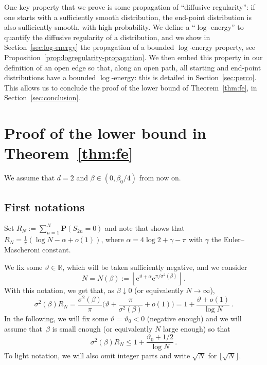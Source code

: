 \documentclass[11pt]{amsart}
\numberwithin{equation}{section}
\newcommand*{\bP}{\mathbf{P}}
\newcommand*{\numberset}{\mathbb}
\newcommand*{\R}{\numberset{R}}
\newcommand{\e}{\mathrm{e}}
\theoremstyle{plain}
\theoremstyle{definition}
\theoremstyle{remark}
\begin{document}
One key property that we prove is some propagation of ``diffusive regularity'': if one starts with a sufficiently smooth distribution, the end-point distribution is also sufficiently smooth, with high probability. 
We define a ``\(\log\)-energy'' to quantify the diffusive regularity of a distribution, and we show in Section~\ref{sec:log-energy} the propagation of a bounded \(\log\)-energy property, see Proposition~\ref{prop:logregularity-propagation}.
We then embed this property in our definition of an open edge so that, along an open path, all starting and end-point distributions have a bounded \(\log\)-energy: this is detailed in Section~\ref{sec:perco}.
This allows us to conclude the proof of the lower bound of Theorem~\ref{thm:fe}, in Section~\ref{sec:conclusion}.






\section{Proof of the lower bound in Theorem~\ref{thm:fe}}
\label{sec:proof}

We assume that $d=2$ and $\beta \in (0,\beta_0/4)$ from now on.

\subsection{First notations}
\label{sec:notations}


Set \(R_N:=\sum_{n=1}^{N}\bP(S_{2n}=0)\) and note that \cite[Proposition~3.2]{CSZ19b} shows that \(R_N = \frac{1}{\pi}(\log N - \alpha +o(1))\), where \(\alpha=4\log 2+\gamma-\pi\) with \(\gamma\) the Euler--Mascheroni constant.

We fix some \(\vartheta \in \R\), which will be taken sufficiently negative, and we consider 
\begin{equation}
       \label{def:N}
       N = N(\beta) := \left\lfloor \e^{\vartheta +\alpha} \e^{\pi/\sigma^2(\beta)} \right\rfloor \,.
\end{equation}
With this notation, we get that, as \(\beta \downarrow 0\) (or equivalently \(N\to\infty\)),
\[
       \sigma^2(\beta)R_N = \frac{\sigma^2(\beta)}{\pi} \Big( \vartheta + \frac{\pi}{\sigma^2(\beta)     } + o(1) \Big)= 1+ \frac{\vartheta+o(1)}{\log N} \,.
\]
In the following, we will fix some \(\vartheta =\vartheta_0<0\) (negative enough) and we will assume that~\(\beta\) is small enough (or equivalently \(N\) large enough) so that
\begin{equation}
       \label{def:critical-window}
       \sigma^2(\beta)R_N \leq 1+ \frac{\vartheta_0+1/2}{\log N} \,.
\end{equation}
To light notation, we will also omit integer parts and write \(\sqrt{N}\) for $\lfloor \sqrt N \rfloor$. 
\end{document}
